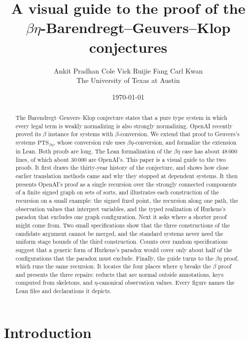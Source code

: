 \documentclass[10pt]{article}
\title{A visual guide to the proof of the\\ $\beta\eta$-Barendregt--Geuvers--Klop conjectures}
\author{Ankit Pradhan \qquad Cole Vick \qquad Ruijie Fang \qquad Carl Kwan\\[4pt]
  \normalsize The University of Texas at Austin}
\date{\today}
\begin{document}
\maketitle

\begin{abstract}
The Barendregt--Geuvers--Klop conjecture states that a pure type system in which
every legal term is weakly normalizing is also strongly normalizing. OpenAI
recently proved its $\beta$ instance for systems with $\beta$-conversion. We extend
that proof to Geuvers's systems $\mathrm{PTS}_{\beta\eta}$, whose conversion rule
uses $\beta\eta$-conversion, and formalize the extension in Lean. Both proofs are
long. The Lean formalization of the $\beta\eta$ case has about 48\,000 lines, of
which about 30\,000 are OpenAI's. This paper is a visual guide to the two proofs.
It first draws the thirty-year history of the conjecture, and shows
how close earlier translation methods came and why they stopped at dependent
systems. It then presents OpenAI's proof as a single recursion over the strongly
connected components of a finite signed graph on sets of sorts, and illustrates each
construction of the recursion on a small example: the signed fixed point, the
recursion along one path, the observation values that interpret variables, and the
typed realization of Hurkens's paradox that excludes one graph configuration. Next
it asks where a shorter proof might come from. Two small specifications show that
the three constructions of the candidate argument cannot be merged, and the standard
systems never need the uniform stage bounds of the third construction. Counts over
random specifications suggest that a generic form of Hurkens's paradox would cover
only about half of the configurations that the paradox must exclude. Finally, the
guide turns to the $\beta\eta$ proof, which runs the same recursion. It locates the
four places where $\eta$ breaks the $\beta$ proof and presents the three repairs:
reducts that are normal outside annotations, keys computed from skeletons, and
$\eta$-canonical observation values. Every figure names the Lean files and
declarations it depicts.
\end{abstract}

\setcounter{tocdepth}{1}
\tableofcontents

\clearpage
\section{Introduction}\label{sec:intro}
\end{document}
